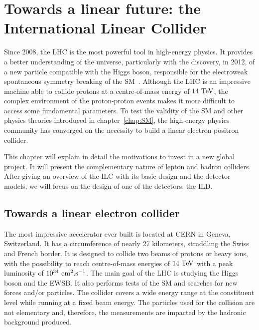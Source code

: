 \chapter{Towards a linear future: the International Linear Collider}
\label{chap:ILC}

  Since 2008, the \acrfull{LHC} is the most powerful tool in high-energy physics.
  It provides a better understanding of the universe, particularly with the discovery, in 2012, of a new particle compatible with the Higgs boson, responsible for the electroweak spontaneous symmetry breaking of the \acrfull{SM}~\cite{Aad2012, Chatrchyan2012}.
  Although the \gls{LHC} is an impressive machine able to collide protons at a centre-of-mass energy of $14~\rm{TeV}$, the complex environment of the proton-proton events makes it more difficult to access some fundamental parameters. 
  To test the validity of the \gls{SM} and other physics theories introduced in chapter~\ref{chap:SM}, the high-energy physics community has converged on the necessity to build a linear electron-positron collider.
  
  This chapter will explain in detail the motivations to invest in a new global project. 
  It will present the complementary nature of lepton and hadron colliders.
  After giving an overview of the \acrfull{ILC} with its basic design and the detector models, we will focus on the design of one of the detectors: the \acrfull{ILD}.

 \minitoc
  
  \section{Towards a linear electron collider}
 
  The most impressive accelerator ever built is located at \gls{CERN} in Geneva, Switzerland. 
  It has a circumference of nearly 27 kilometers, straddling the Swiss and French border.
  It is designed to collide two beams of protons or heavy ions, with the possibility to reach centre-of-mass energies of $14~\rm{TeV}$ with a peak luminosity of $10^{34}~\rm{cm}^2\rm{.s}^{-1}$.
  The  main goal of the \gls{LHC} is studying the Higgs boson and the \gls{EWSB}. 
  It also performs tests of the \gls{SM} and searches for new forces and/or particles. 
  The collider covers a wide energy range at the constituent level while running at a fixed beam energy.
  The particles used for the collision are not elementary and, therefore, the measurements are impacted by the hadronic background produced.
  
